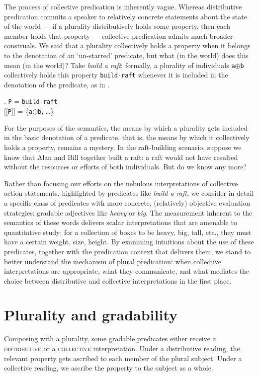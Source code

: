 \documentclass[linguex]{sp}
\newcommand{\sem}[1]{\mbox{$[\![$#1$]\!]$}}
\renewcommand{\tt}{\texttt}
\newcommand{\op}{$\oplus$}
\begin{document}
The process of collective predication is inherently vague. Whereas distributive predication commits a speaker to relatively concrete statements about the state of the world --- if a plurality distributively holds some property, then each member holds that property --- collective predication admits much broader construals. We said that a plurality collectively holds a property when it belongs to the denotation of an `un-starred' predicate, but what (in the world) does this mean (in the world)? Take \emph{build a raft}: formally, a plurality of individuals \tt{a}\op\tt{b} collectively holds this property \tt{build-raft} whenever it is included in the denotation of the predicate, as in \Next.

\ex. \tt{P} = \tt{build-raft}\\
\sem{\tt{P}} = \{\tt{a}\op\tt{b}, \ldots\}

For the purposes of the semantics, the means by which a plurality gets included in the basic denotation of a predicate, that is, the means by which it collectively holds a property, remains a mystery. In the raft-building scenario, suppose we know that Alan and Bill together built a raft: a raft would not have resulted without the resources or efforts of both individuals. But do we know any more?

Rather than focusing our efforts on the nebulous interpretations of collective action statements, highlighted by predicates like \emph{build a raft}, we consider in detail a specific class of predicates with more concrete, (relatively) objective evaluation strategies: gradable adjectives like \emph{heavy} or \emph{big}. The measurement inherent to the semantics of these words delivers scalar interpretations that are amenable to quantitative study: for a collection of boxes to be heavy, big, tall, etc., they must have a certain weight, size, height. By examining intuitions about the use of these predicates, together with the predication context that delivers them, we stand to better understand the mechanism of plural predication: when collective interpretations are appropriate, what they communicate, and what mediates the choice between distributive and collective interpretations in the first place.


\section{Plurality and gradability}

Composing with a plurality, some gradable predicates either receive a \textsc{distributive} or a \textsc{collective} interpretation. Under a distributive reading, the relevant property gets ascribed to each member of the plural subject. Under a collective reading, we ascribe the property to the subject as a whole.
\end{document}
